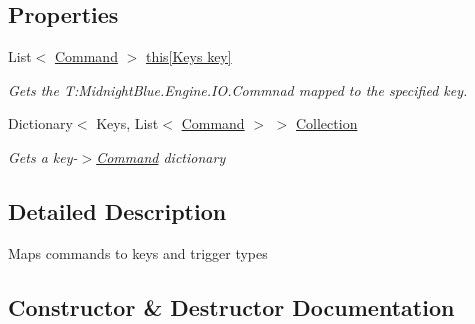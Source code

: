 \subsection*{Properties}
\begin{DoxyCompactItemize}
\item 
List$<$ \hyperlink{class_midnight_blue_1_1_engine_1_1_i_o_1_1_command}{Command} $>$ \hyperlink{class_midnight_blue_1_1_engine_1_1_i_o_1_1_input_map_a7262adae27e262343d8616a225ef94ff}{this\mbox{[}\+Keys key\mbox{]}}
\begin{DoxyCompactList}\small\item\em Gets the T\+:\+Midnight\+Blue.\+Engine.\+I\+O.\+Commnad mapped to the specified key. \end{DoxyCompactList}\item 
Dictionary$<$ Keys, List$<$ \hyperlink{class_midnight_blue_1_1_engine_1_1_i_o_1_1_command}{Command} $>$ $>$ \hyperlink{class_midnight_blue_1_1_engine_1_1_i_o_1_1_input_map_a0f67e318606931a3c38042f2bd29ab97}{Collection}
\begin{DoxyCompactList}\small\item\em Gets a key-\/$>$\hyperlink{class_midnight_blue_1_1_engine_1_1_i_o_1_1_command}{Command} dictionary \end{DoxyCompactList}\end{DoxyCompactItemize}


\subsection{Detailed Description}
Maps commands to keys and trigger types 



\subsection{Constructor \& Destructor Documentation}
\hypertarget{class_midnight_blue_1_1_engine_1_1_i_o_1_1_input_map_aefd9eca9502059a5f316b31816b96604}{}\label{class_midnight_blue_1_1_engine_1_1_i_o_1_1_input_map_aefd9eca9502059a5f316b31816b96604} 
